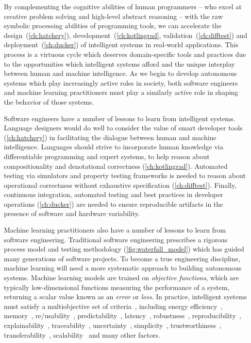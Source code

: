 By complementing the cognitive abilities of human programmers -- who excel at creative problem solving and high-level abstract reasoning -- with the raw symbolic processing abilities of programming tools, we can accelerate the design~(\autoref{ch:hatchery}), development~(\autoref{ch:kotlingrad}, validation~(\autoref{ch:difftest}) and deployment~(\autoref{ch:ducker}) of intelligent systems in real-world applications. This process is a virtuous cycle which deserves domain-specific tools and practices due to the opportunities which intelligent systems afford and the unique interplay between human and machine intelligence. As we begin to develop autonomous systems which play increasingly active roles in society, both software engineers and machine learning practitioners must play a similarly active role in shaping the behavior of those systems.

Software engineers have a number of lessons to learn from intelligent systems. Language designers would do well to consider the value of smart developer tools (\autoref{ch:hatchery}) in facilitating the dialogue between human and machine intelligence. Languages should strive to incorporate human knowledge via differentiable programming and expert systems, to help reason about compositionality and denotational correctness (\autoref{ch:kotlingrad}). Automated testing via simulators and property testing frameworks is needed to reason about operational correctness without exhaustive specification (\autoref{ch:difftest}). Finally, continuous integration, automated testing and best practices in developer operations (\autoref{ch:ducker}) are needed to ensure reproducible artifacts in the presence of software and hardware variability.

Machine learning practitioners also have a number of lessons to learn from software engineering. Traditional software engineering prescribes a rigorous process model and testing methodology (\autoref{fig:waterfall_model}) which has guided many generations of software projects. To become a true engineering discipline, machine learning will need a more systematic approach to building autonomous systems. Machine learning models are trained on \textit{objective functions}, which are typically low-dimensional functions measuring the performance of a system, returning a scalar value known as an \textit{error} or \textit{loss}. In practice, intelligent systems must satisfy a multiobjective set of criteria~\citep{censi2015mathematical}, including energy efficiency~\citep{paull2010novel}, memory~\citep{memory2013mitliagkas}, re/usability~\citep{breuleux2017automatic,deleu2019torchmeta}, predictability~\citep{turner2017well}, latency~\citep{ravanelli2018twin}, robustness~\citep{pineau2003policy}, reproducibility~\citep{pineau2019improving}, explainability~\citep{turner2016model}, traceability~\citep{guo2017semantically, tsirigotis2018orion}, uncertainty~\citep{diaz2018interactive}, simplicity~\citep{kastner2019representation}, trustworthiness~\citep{xu2017efficient}, transferability~\citep{mehta2019active}, scalability~\citep{luan2019break} and many other factors.

